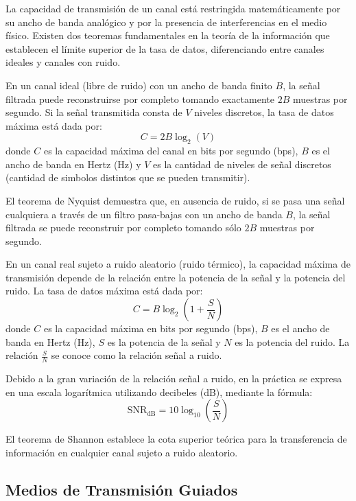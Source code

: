 La capacidad de transmisión de un canal está restringida matemáticamente por su ancho de banda analógico y por la presencia de interferencias en el medio físico. Existen dos teoremas fundamentales en la teoría de la información que establecen el límite superior de la tasa de datos, diferenciando entre canales ideales y canales con ruido.

\begin{teo}
En un canal ideal (libre de ruido) con un ancho de banda finito $B$, la señal filtrada puede reconstruirse por completo tomando exactamente $2B$ muestras por segundo. Si la señal transmitida consta de $V$ niveles discretos, la tasa de datos máxima está dada por:
$$C = 2B \log_2(V)$$
donde $C$ es la capacidad máxima del canal en bits por segundo (bps), $B$ es el ancho de banda en Hertz (Hz) y $V$ es la cantidad de niveles de señal discretos (cantidad de simbolos distintos que se pueden transmitir).
\end{teo}

El teorema de Nyquist demuestra que, en ausencia de ruido, si se pasa una señal cualquiera a través de un filtro pasa-bajas con un ancho de banda $B$, la señal filtrada se puede reconstruir por completo tomando sólo $2B$ muestras por segundo.

\begin{teo}
En un canal real sujeto a ruido aleatorio (ruido térmico), la capacidad máxima de transmisión depende de la relación entre la potencia de la señal y la potencia del ruido. La tasa de datos máxima está dada por:
$$C = B \log_2\left(1 + \frac{S}{N}\right)$$
donde $C$ es la capacidad máxima en bits por segundo (bps), $B$ es el ancho de banda en Hertz (Hz), $S$ es la potencia de la señal y $N$ es la potencia del ruido. La relación $\frac{S}{N}$ se conoce como la relación señal a ruido.
\end{teo}

Debido a la gran variación de la relación señal a ruido, en la práctica se expresa en una escala logarítmica utilizando decibeles (dB), mediante la fórmula:
$$\text{SNR}_{\text{dB}} = 10 \log_{10}\left(\frac{S}{N}\right)$$

El teorema de Shannon establece la cota superior teórica para la transferencia de información en cualquier canal sujeto a ruido aleatorio.

\subsection{Medios de Transmisión Guiados}

